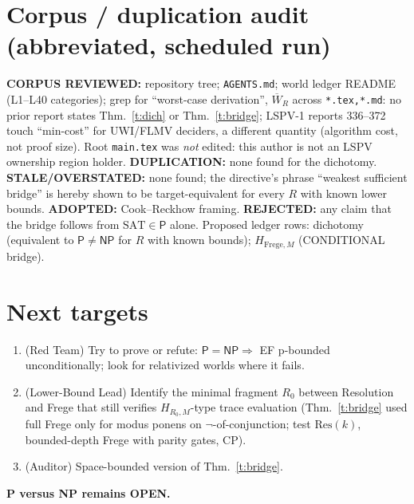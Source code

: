 \documentclass[11pt]{article}
\theoremstyle{remark}
\begin{document}
\section{Corpus / duplication audit (abbreviated, scheduled run)}
\textbf{CORPUS REVIEWED:} repository tree; \texttt{AGENTS.md}; world ledger README (L1--L40 categories); grep for
``worst-case derivation'', $\overline W_R$ across \texttt{*.tex,*.md}: no prior report states Thm.~\ref{t:dich}
or Thm.~\ref{t:bridge}; LSPV-1 reports 336--372 touch ``min-cost'' for UWI/FLMV deciders, a different quantity (algorithm
cost, not proof size). Root \texttt{main.tex} was \emph{not} edited: this author is not an LSPV ownership
region holder. \textbf{DUPLICATION:} none found for the dichotomy. \textbf{STALE/OVERSTATED:} none found; the
directive's phrase ``weakest sufficient bridge'' is hereby shown to be target-equivalent for every $R$ with known
lower bounds. \textbf{ADOPTED:} Cook--Reckhow framing. \textbf{REJECTED:} any claim that the bridge follows from
$\mathrm{SAT}\in\mathsf P$ alone. Proposed ledger rows: dichotomy (equivalent to $\mathsf P\ne\mathsf{NP}$ for $R$ with known bounds);
$H_{\mathrm{Frege},M}$ (CONDITIONAL bridge).

\section{Next targets}
\begin{enumerate}
\item (Red Team) Try to prove or refute: $\mathsf P=\mathsf{NP}\Rightarrow$ EF p-bounded unconditionally; look for
relativized worlds where it fails.
\item (Lower-Bound Lead) Identify the minimal fragment $R_0$ between Resolution and Frege that still
verifies $H_{R_0,M}$-type trace evaluation (Thm.~\ref{t:bridge} used full Frege only for modus ponens on
$\neg$-of-conjunction; test $\mathrm{Res}(k)$, bounded-depth Frege with parity gates, CP).
\item (Auditor) Space-bounded version of Thm.~\ref{t:bridge}.
\end{enumerate}

\noindent\textbf{P versus NP remains OPEN.}

\end{document}
